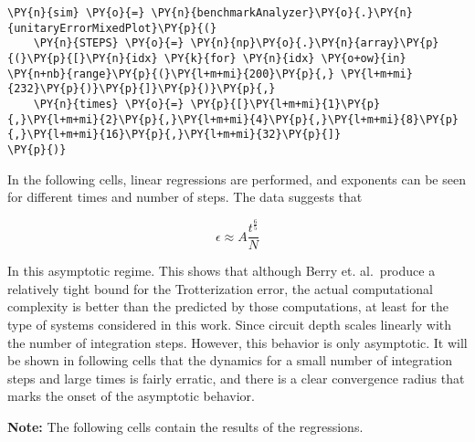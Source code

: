     \begin{tcolorbox}[breakable, size=fbox, boxrule=1pt, pad at break*=1mm,colback=cellbackground, colframe=cellborder]
\begin{Verbatim}[commandchars=\\\{\}]
\PY{n}{sim} \PY{o}{=} \PY{n}{benchmarkAnalyzer}\PY{o}{.}\PY{n}{unitaryErrorMixedPlot}\PY{p}{(}
    \PY{n}{STEPS} \PY{o}{=} \PY{n}{np}\PY{o}{.}\PY{n}{array}\PY{p}{(}\PY{p}{[}\PY{n}{idx} \PY{k}{for} \PY{n}{idx} \PY{o+ow}{in} \PY{n+nb}{range}\PY{p}{(}\PY{l+m+mi}{200}\PY{p}{,} \PY{l+m+mi}{232}\PY{p}{)}\PY{p}{]}\PY{p}{)}\PY{p}{,}
    \PY{n}{times} \PY{o}{=} \PY{p}{[}\PY{l+m+mi}{1}\PY{p}{,}\PY{l+m+mi}{2}\PY{p}{,}\PY{l+m+mi}{4}\PY{p}{,}\PY{l+m+mi}{8}\PY{p}{,}\PY{l+m+mi}{16}\PY{p}{,}\PY{l+m+mi}{32}\PY{p}{]}
\PY{p}{)}
\end{Verbatim}
\end{tcolorbox}

    In the following cells, linear regressions are performed, and exponents
can be seen for different times and number of steps. The data suggests
that

\[
\epsilon \approx A \frac{t^{\frac{6}{5}}}{N}
\]

In this asymptotic regime. This shows that although Berry et.
al.~produce a relatively tight bound for the Trotterization error, the
actual computational complexity is better than the predicted by those
computations, at least for the type of systems considered in this work.
Since circuit depth scales linearly with the number of integration
steps. However, this behavior is only asymptotic. It will be shown in
following cells that the dynamics for a small number of integration
steps and large times is fairly erratic, and there is a clear
convergence radius that marks the onset of the asymptotic behavior.

\textbf{Note:} The following cells contain the results of the
regressions.

